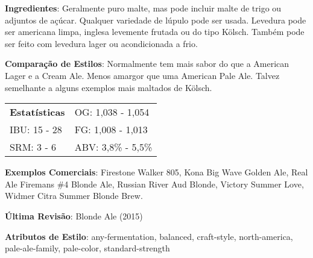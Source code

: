 \textbf{Ingredientes}: Geralmente puro malte, mas pode incluir malte de trigo ou adjuntos de açúcar. Qualquer variedade de lúpulo pode ser usada. Levedura pode ser americana limpa, inglesa levemente frutada ou do tipo Kölsch. Também pode ser feito com levedura lager ou acondicionada a frio.

\textbf{Comparação de Estilos}: Normalmente tem mais sabor do que a American Lager e a Cream Ale. Menos amargor que uma American Pale Ale. Talvez semelhante a alguns exemplos mais maltados de Kölsch.

\begin{tabular}{@{}p{35mm}p{35mm}@{}}
  \textbf{Estatísticas} & OG: 1,038 - 1,054 \\
  IBU: 15 - 28  & FG: 1,008 - 1,013  \\
  SRM: 3 - 6  & ABV: 3,8\% - 5,5\%
\end{tabular}

\textbf{Exemplos Comerciais}: Firestone Walker 805, Kona Big Wave Golden Ale, Real Ale Firemans \#4 Blonde Ale, Russian River Aud Blonde, Victory Summer Love, Widmer Citra Summer Blonde Brew.

\textbf{Última Revisão}: Blonde Ale (2015)

\textbf{Atributos de Estilo}: any-fermentation, balanced, craft-style, north-america, pale-ale-family, pale-color, standard-strength
